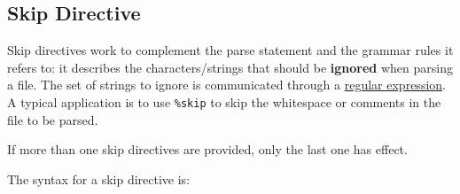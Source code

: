 
\subsection{Skip Directive}
{
	Skip directives work to complement the parse statement and the
	grammar rules it refers to: it describes the characters/strings that
	should be \textbf{ignored} when parsing a file. The set of strings to
	ignore is communicated through a \hyperref[sec:regex]{regular expression}.
	A typical application is to use \texttt{\%skip} to skip the whitespace
	or comments in the file to be parsed.
	
	If more than one skip directives are provided, only
	the last one has effect.
	
	The syntax for a skip directive is:
	\begin{lstlisting}[numbers=none, numbers = none, texcl = true, language = MAIA]
%skip: <regular-expression>;
	\end{lstlisting}
}
